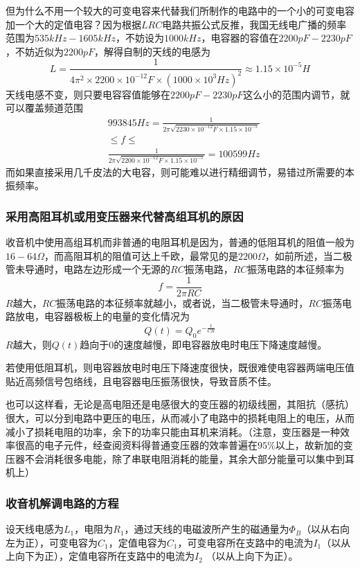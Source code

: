 \documentclass[10pt,a4paper]{article}
\theoremstyle{remark}
\begin{document}
但为什么不用一个较大的可变电容来代替我们所制作的电路中的一个小的可变电容加一个大的定值电容？因为根据$LRC$电路共振公式反推，我国无线电广播的频率范围为$535kHz-1605kHz$，不妨设为$1000kHz$，电容器的容值在$2200pF-2230pF$，不妨近似为$2200pF$，解得自制的天线的电感为
\[
L = \frac{1}{4\pi^2\times2200\times{10}^{-12}F\times(1000\times{10}^{3}Hz)^2} \approx 1.15\times{10}^{-5}H
\]
天线电感不变，则只要电容容值能够在$2200pF-2230pF$这么小的范围内调节，就可以覆盖频道范围
\[
\begin{split}
&993845Hz = \frac{1}{2\pi\sqrt{2230\times{10}^{-12}F\times1.15\times{10}^{-5}}}\\
&\leq f \leq\\
&\frac{1}{2\pi\sqrt{2200\times{10}^{-12}F\times1.15\times{10}^{-5}}} = 100599Hz
\end{split}
\]
而如果直接采用几千皮法的大电容，则可能难以进行精细调节，易错过所需要的本振频率。
\subsubsection{采用高阻耳机或用变压器来代替高组耳机的原因}
收音机中使用高组耳机而非普通的电阻耳机是因为，普通的低阻耳机的阻值一般为$16-64\Omega$，而高阻耳机的阻值可达上千欧，最常见的是$2200\Omega$，如前所述，当二极管未导通时，电路左边形成一个无源的$RC$振荡电路，$RC$振荡电路的本征频率为
\[
f = \frac{1}{2\pi RC}
\]
$R$越大，$RC$振荡电路的本征频率就越小，或者说，当二极管未导通时，$RC$振荡电路放电，电容器极板上的电量的变化情况为
\[
Q(t) = Q_0e^{-\frac{t}{CR}}
\]
$R$越大，则$Q(t)$趋向于$0$的速度越慢，即电容器放电时电压下降速度越慢。

若使用低阻耳机，则电容器放电时电压下降速度很快，既很难使电容器两端电压值贴近高频信号包络线，且电容器电压振荡很快，导致音质不佳。

也可以这样看，无论是高电阻还是电感很大的变压器的初级线圈，其阻抗（感抗）很大，可以分到电路中更压的电压，从而减小了电路中的损耗电阻上的电压，从而减小了损耗电阻的功率，余下的功率只能由耳机来消耗。（注意，变压器是一种效率很高的电子元件，经查阅资料得普通变压器的效率普遍在$95\%$以上，故新加的变压器不会消耗很多电能，除了串联电阻消耗的能量，其余大部分能量可以集中到耳机上）
\subsubsection{收音机解调电路的方程}
设天线电感为$L_1$，电阻为$R_1$，通过天线的电磁波所产生的磁通量为$\Phi_B$（以从右向左为正），可变电容为$C_1$，定值电容为$C_1$，可变电容所在支路中的电流为$I_1$（以从上向下为正），定值电容所在支路中的电流为$I_2$ （以从上向下为正）。
\end{document}
